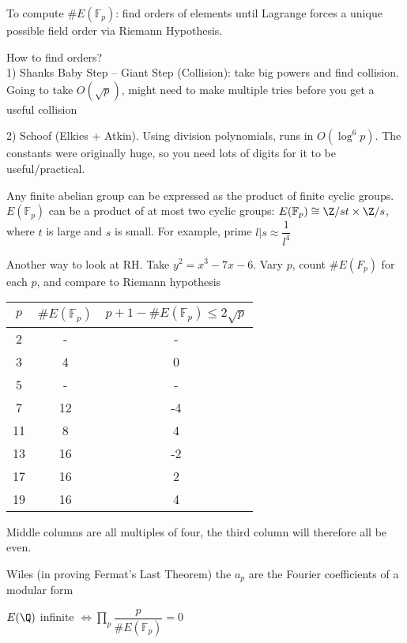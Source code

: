 \documentclass[10pt]{article}
\newcommand{\F}{\mathbb{F}}
\begin{document}
To compute $\#E(\F_p)$: find orders of elements until Lagrange forces a unique possible field order via Riemann Hypothesis.

How to find orders?\\
1) Shanks Baby Step -- Giant Step (Collision): take big powers and find collision. Going to take $O(\sqrt{p})$, might need to make multiple tries before you get a useful collision

2) Schoof (Elkies + Atkin). Using division polynomials, runs in $O(\log^6 p)$. The constants were originally huge, so you need lots of digits for it to be useful/practical.

\begin{rmk}
    Any finite abelian group can be expressed as the product of finite cyclic groups. $E(\F_p)$ can be a product of at most two cyclic groups: $E(\F_p) \cong \Z/st \times \Z/s$, where $t$ is large and $s$ is small. For example, prime $l | s \approx \dfrac{1}{l^4}$
\end{rmk}

\begin{exm*}
    Another way to look at RH. Take $y^2 = x^3 - 7x - 6$. Vary $p$, count $\#E(F_p)$ for each $p$, and compare to Riemann hypothesis
\end{exm*}

\begin{tabular}{c|c|c}
    $p$ & $\#E(\F_p)$ & $p + 1 - \#E(\F_p) \leq 2\sqrt{p}$\\
    \hline
    2 & - & -\\
    3 & 4 & 0\\
    5 & - & -\\
    7 & 12 & -4\\
    11 & 8 & 4\\
    13 & 16 & -2\\
    17 & 16 & 2\\
    19 & 16 & 4\\
\end{tabular}

Middle columns are all multiples of four, the third column will therefore all be even.

\begin{rmk}
    Wiles (in proving Fermat's Last Theorem) the $a_p$ are the Fourier coefficients of a modular form %
\end{rmk}
\begin{rmk}
    $E(\Q)$ infinite $\iff \prod\limits_p \dfrac{p}{\#E(\F_p)} = 0$
\end{rmk}
\end{document}
